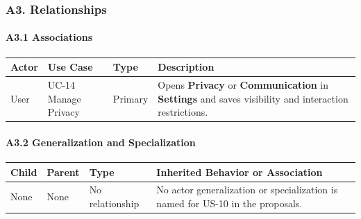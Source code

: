 \documentclass[12pt]{article}
\renewcommand{\baselinestretch}{1.5}
\begin{document}
\subsubsection*{A3. Relationships}
\par\medskip

\hypertarget{sec:a3-1-associations}{}
\paragraph*{A3.1 Associations}
\par\medskip

\begingroup
\small
\renewcommand{\baselinestretch}{1.0}\selectfont
\renewcommand{\arraystretch}{1.15}
\setlength{\tabcolsep}{6pt}
\begin{longtable}{|>{\raggedright\arraybackslash}p{}|>{\raggedright\arraybackslash}p{}|>{\raggedright\arraybackslash}p{}|>{\raggedright\arraybackslash}p{}|}
\hline
\textbf{Actor} & \textbf{Use Case} & \textbf{Type} & \textbf{Description} \\ \hline
\endhead
User & UC-14 Manage Privacy & Primary & Opens \textbf{Privacy} or \textbf{Communication} in \textbf{Settings} and saves visibility and interaction restrictions. \\ \hline
\end{longtable}
\endgroup
\par\medskip

\hypertarget{sec:a3-2-generalization-and-specialization}{}
\paragraph*{A3.2 Generalization and Specialization}
\par\medskip

\begingroup
\small
\renewcommand{\baselinestretch}{1.0}\selectfont
\renewcommand{\arraystretch}{1.15}
\setlength{\tabcolsep}{6pt}
\begin{longtable}{|>{\raggedright\arraybackslash}p{}|>{\raggedright\arraybackslash}p{}|>{\raggedright\arraybackslash}p{}|>{\raggedright\arraybackslash}p{}|}
\hline
\textbf{Child} & \textbf{Parent} & \textbf{Type} & \textbf{Inherited Behavior or Association} \\ \hline
\endhead
None & None & No relationship & No actor generalization or specialization is named for US-10 in the proposals. \\ \hline
\end{longtable}
\endgroup
\par\medskip
\end{document}
